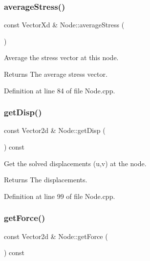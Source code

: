 \subsubsection{\texorpdfstring{average\+Stress()}{averageStress()}}
{\footnotesize\ttfamily const Vector\+Xd \& Node\+::average\+Stress (\begin{DoxyParamCaption}{ }\end{DoxyParamCaption})}



Average the stress vector at this node. 

\begin{DoxyReturn}{Returns}
The average stress vector. 
\end{DoxyReturn}


Definition at line 84 of file Node.\+cpp.

\mbox{\label{class_node_a2024b690427f7840b18dc429d4acba7d}} 
\subsubsection{\texorpdfstring{get\+Disp()}{getDisp()}}
{\footnotesize\ttfamily const Vector2d \& Node\+::get\+Disp (\begin{DoxyParamCaption}{ }\end{DoxyParamCaption}) const}



Get the solved displacements (u,v) at the node. 

\begin{DoxyReturn}{Returns}
The displacements. 
\end{DoxyReturn}


Definition at line 99 of file Node.\+cpp.

\mbox{\label{class_node_acb1728229a234694419ecda6ad5928c4}} 
\subsubsection{\texorpdfstring{get\+Force()}{getForce()}}
{\footnotesize\ttfamily const Vector2d \& Node\+::get\+Force (\begin{DoxyParamCaption}{ }\end{DoxyParamCaption}) const}



